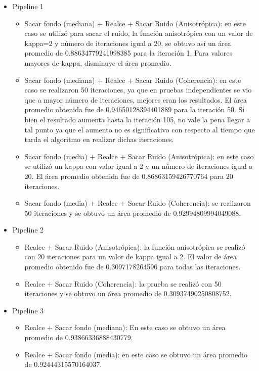 \begin{itemize}
	\item Pipeline 1
		\begin{itemize}
			\item	Sacar fondo (mediana) + Realce + Sacar Ruido (Anisotrópica): en este caso se utilizó para 	sacar el ruido, la función anisotrópica con un valor de kappa=2 y número de iteraciones igual a 20, se obtuvo así un área promedio de 0.88634779241998385 para la iteración 1. Para valores mayores de kappa, disminuye el área promedio.
			\item	Sacar fondo (mediana) + Realce + Sacar Ruido (Coherencia): en este caso se realizaron 50 iteraciones, ya que en pruebas independientes se vio que a mayor número de iteraciones, mejores eran los resultados. El área promedio obtenida fue de 0.94650128394401889 para la iteración 50. Si bien el resultado aumenta hasta la iteración 105, no vale la pena llegar a tal punto ya que el aumento no es significativo con respecto al tiempo que tarda el algoritmo en realizar dichas iteraciones.
			\item Sacar fondo (media) + Realce + Sacar Ruido (Anisotrópica): en este caso se utilizó un kappa con valor igual a 2 y un número de iteraciones igual a 20. El área promedio obtenida fue de 	 	0.86863159426770764 para 20 iteraciones.
			\item Sacar fondo (media) + Realce + Sacar Ruido (Coherencia): se realizaron 50 iteraciones y se obtuvo un área promedio de 0.92994809994049088.
	\end{itemize}
	\item Pipeline 2
		\begin{itemize}
			\item Realce + Sacar Ruido (Anisotrópica): la función anisotrópica se realizó con 20 iteraciones para un valor de kappa igual a 2. El valor de área promedio obtenido fue de 0.3097178264596 para todas las iteraciones.
			\item	Realce + Sacar Ruido (Coherencia): la prueba se realizó con 50 iteraciones y se obtuvo un área promedio de  0.30937490250808752.
		\end{itemize}
	\item Pipeline 3
		\begin{itemize}
			\item Realce + Sacar fondo (mediana): En este caso se obtuvo un área promedio de 0.93866336888430779.
			\item Realce + Sacar fondo (media): en este caso se obtuvo un área promedio de 0.92444315570164037.

\end{itemize}
\end{itemize}
